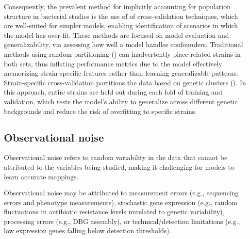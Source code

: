\documentclass[12pt]{article}
\begin{document}

Consequently, the prevalent method for implicitly accounting for population structure in bacterial studies is the use of of cross-validation techniques, which are well-suited for simpler models, enabling identification of scenarios in which the model has over-fit. These methods are focused on model evaluation and generalizability, via assessing how well a model handles confounders. Traditional methods using random partitioning (\cite{pincus2020genome}) can inadvertently place related strains in both sets, thus inflating performance metrics due to the model effectively memorizing strain-specific features rather than learning generalizable patterns. Strain-specific cross-validation partitions the data based on genetic clusters (\cite{lees2020improved}). In this approach, entire strains are held out during each fold of training and validation, which tests the model’s ability to generalize across different genetic backgrounds and reduce the risk of overfitting to specific strains.






\subsection{Observational noise}
Observational noise refers to random variability in the data that cannot be attributed to the variables being studied, making it challenging for models to learn accurate mappings.

Observational noise may be attributed to measurement errors (e.g., sequencing errors and phenotype measurements), stochastic gene expression (e.g., random fluctuations in antibiotic resistance levels unrelated to genetic variability), processing errors (e.g., DBG assembly), or technical/detection limitations (e.g., low expression genes falling below detection thresholds).

\end{document}
